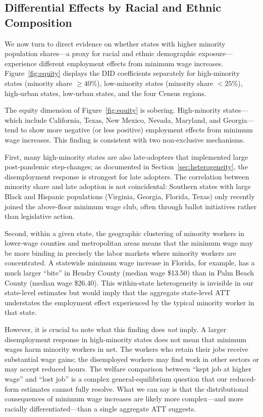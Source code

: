 \documentclass[12pt]{article}
\begin{document}
\subsection{Differential Effects by Racial and Ethnic Composition}

We now turn to direct evidence on whether states with higher minority
population shares---a proxy for racial and ethnic demographic exposure---
experience different employment effects from minimum wage increases.
Figure~\ref{fig:equity} displays the DID coefficients separately for
high-minority states (minority share $\geq 40\%$), low-minority states
(minority share $< 25\%$), high-urban states, low-urban states, and the
four Census regions.

The equity dimension of Figure~\ref{fig:equity} is sobering.  High-minority
states---which include California, Texas, New Mexico, Nevada, Maryland, and
Georgia---tend to show more negative (or less positive) employment effects
from minimum wage increases.  This finding is consistent with two non-exclusive
mechanisms.

First, many high-minority states are also late-adopters that implemented large
post-pandemic step-changes; as documented in Section~\ref{sec:heterogeneity},
the disemployment response is strongest for late adopters.  The correlation
between minority share and late adoption is not coincidental: Southern states
with large Black and Hispanic populations (Virginia, Georgia, Florida, Texas)
only recently joined the above-floor minimum wage club, often through ballot
initiatives rather than legislative action.

Second, within a given state, the geographic clustering of minority workers
in lower-wage counties and metropolitan areas means that the minimum wage may
be more binding in precisely the labor markets where minority workers are
concentrated.  A statewide minimum wage increase in Florida, for example, has
a much larger ``bite'' in Hendry County (median wage \$13.50) than in Palm
Beach County (median wage \$26.40).  This within-state heterogeneity is
invisible in our state-level estimates but would imply that the aggregate
state-level ATT understates the employment effect experienced by the typical
minority worker in that state.

However, it is crucial to note what this finding does \emph{not} imply.
A larger disemployment response in high-minority states does not mean that
minimum wages harm minority workers in net.  The workers who retain their
jobs receive substantial wage gains; the disemployed workers may find work in
other sectors or may accept reduced hours.  The welfare comparison between
``kept job at higher wage'' and ``lost job'' is a complex general-equilibrium
question that our reduced-form estimates cannot fully resolve.  What we can
say is that the distributional consequences of minimum wage increases are
likely more complex---and more racially differentiated---than a single
aggregate ATT suggests.
\end{document}
